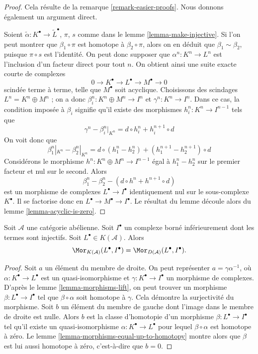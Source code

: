 \begin{proof}
Cela résulte de la remarque \ref{remark-easier-proofs}. Nous donnons également
un argument direct.

\medskip\noindent
Soient $\tilde \alpha : K^\bullet \to \tilde L^\bullet$, $\pi$, $s$ comme
dans le lemme \ref{lemma-make-injective}. Si l'on peut montrer que
$\beta_1 \circ\pi$ est homotope à $\beta_2 \circ \pi$, alors on en déduit que
$\beta_1 \sim \beta_2$, puisque $\pi \circ s$ est l'identité. On peut donc
supposer que $\alpha^n : K^n \to L^n$ est l'inclusion d'un facteur direct pour
tout $n$. On obtient ainsi une suite exacte courte de complexes
$$
0 \to K^\bullet \to L^\bullet \to M^\bullet \to 0
$$
scindée terme à terme, telle que $M^\bullet$ soit acyclique. Choisissons des
scindages $L^n = K^n \oplus M^n$ ; on a donc
$\beta_i^n : K^n \oplus M^n \to I^n$ et $\gamma^n : K^n \to I^n$. Dans ce
cas, la condition imposée à $\beta_i$ signifie qu'il existe des morphismes
$h_i^n : K^n \to I^{n - 1}$ tels que
$$
\gamma^n - \beta_i^n|_{K^n} = d \circ h_i^n + h_i^{n + 1} \circ d
$$
On voit donc que
$$
\beta_1^n|_{K^n} - \beta_2^n|_{K^n}
=
d \circ (h_1^n - h_2^n) + (h_1^{n + 1} - h_2^{n + 1}) \circ d
$$
Considérons le morphisme $h^n : K^n \oplus M^n \to I^{n - 1}$ égal à
$h_1^n - h_2^n$ sur le premier facteur et nul sur le second. Alors
$$
\beta_1^n - \beta_2^n
-
(d \circ h^n + h^{n + 1} \circ d)
$$
est un morphisme de complexes $L^\bullet \to I^\bullet$ identiquement nul sur
le sous-complexe $K^\bullet$. Il se factorise donc en
$L^\bullet \to M^\bullet \to I^\bullet$. Le résultat du lemme découle alors
du lemme \ref{lemma-acyclic-is-zero}.
\end{proof}

\begin{lemma}
\label{lemma-morphisms-into-injective-complex}
Soit $\mathcal{A}$ une catégorie abélienne. Soit $I^\bullet$ un complexe borné
inférieurement dont les termes sont injectifs. Soit
$L^\bullet \in K(\mathcal{A})$. Alors
$$
\Mor_{K(\mathcal{A})}(L^\bullet, I^\bullet)
=
\Mor_{D(\mathcal{A})}(L^\bullet, I^\bullet).
$$
\end{lemma}

\begin{proof}
Soit $a$ un élément du membre de droite. On peut représenter
$a = \gamma\alpha^{-1}$, où $\alpha : K^\bullet \to L^\bullet$ est un
quasi-isomorphisme et $\gamma : K^\bullet \to I^\bullet$ un morphisme de
complexes. D'après le lemme \ref{lemma-morphisms-lift}, on peut trouver un
morphisme $\beta : L^\bullet \to I^\bullet$ tel que
$\beta \circ \alpha$ soit homotope à $\gamma$. Cela démontre la surjectivité
du morphisme. Soit $b$ un élément du membre de gauche dont l'image dans le
membre de droite est nulle. Alors $b$ est la classe d'homotopie d'un morphisme
$\beta : L^\bullet \to I^\bullet$ tel qu'il existe un quasi-isomorphisme
$\alpha : K^\bullet \to L^\bullet$ pour lequel $\beta  \circ \alpha$ est
homotope à zéro. Le lemme \ref{lemma-morphisms-equal-up-to-homotopy} montre
alors que $\beta$ est lui aussi homotope à zéro, c'est-à-dire que $b = 0$.
\end{proof}

